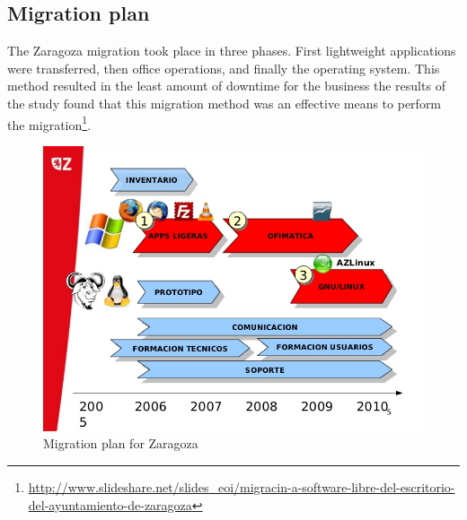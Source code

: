 \subsection{Migration plan}

  The Zaragoza migration took place in three phases. First lightweight applications were transferred, then office operations, and finally the operating system. This method resulted in the least amount of downtime for the business the results of the study found that this migration method was an effective means to perform the migration\footnote{\url{http://www.slideshare.net/slides\_eoi/migracin-a-software-libre-del-escritorio-del-ayuntamiento-de-zaragoza}}.

 \begin{figure}[H]
 \centering
     \includegraphics[scale=0.5]{img/desktopplan.jpg} 
  \caption[Migration plan in Zaragoza]{Migration plan for Zaragoza \protect\footnotemark}   
     \label {fig:plan-Zara}
     \end{figure}
     
